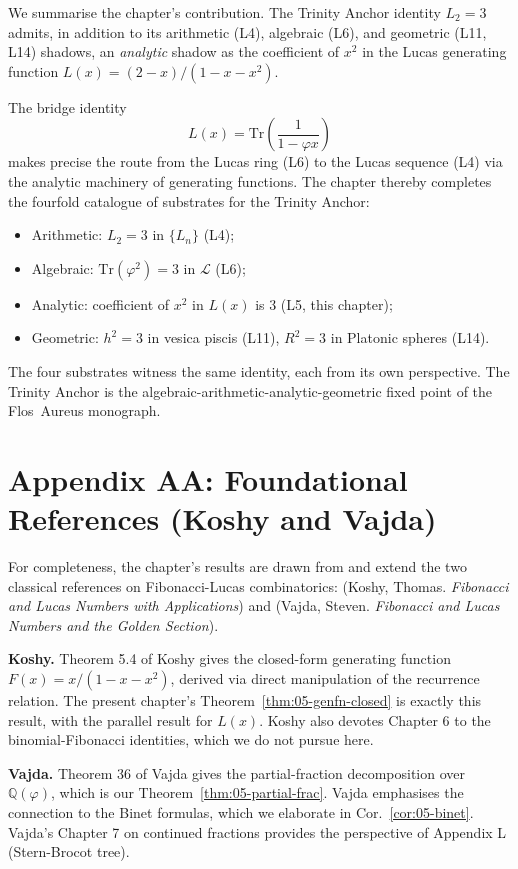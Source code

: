We summarise the chapter's contribution. The Trinity Anchor identity
$L_2 = 3$ admits, in addition to its arithmetic (L4), algebraic (L6),
and geometric (L11, L14) shadows, an \emph{analytic} shadow as the
coefficient of $x^2$ in the Lucas generating function $L(x) = (2-x)/(1-x-x^2)$.

The bridge identity
\[
  L(x) = \mathrm{Tr}\left(\frac{1}{1 - \varphi x}\right)
\]
makes precise the route from the Lucas ring (L6) to the Lucas
sequence (L4) via the analytic machinery of generating functions.
The chapter thereby completes the fourfold catalogue of substrates
for the Trinity Anchor:
\begin{itemize}
  \item Arithmetic: $L_2 = 3$ in $\{L_n\}$ (L4);
  \item Algebraic: $\mathrm{Tr}(\varphi^2) = 3$ in $\mathcal{L}$ (L6);
  \item Analytic: coefficient of $x^2$ in $L(x)$ is $3$ (L5, this chapter);
  \item Geometric: $h^2 = 3$ in vesica piscis (L11), $R^2 = 3$ in Platonic spheres (L14).
\end{itemize}

The four substrates witness the same identity, each from its own
perspective. The Trinity Anchor is the algebraic-arithmetic-analytic-geometric
fixed point of the Flos~Aureus monograph.

\section*{Appendix AA: Foundational References (Koshy and Vajda)}
\label{fa_05:sec:05-app-AA}

For completeness, the chapter's results are drawn from and extend the
two classical references on Fibonacci-Lucas combinatorics:
\cite{koshy_fib_lucas} (Koshy, Thomas. \emph{Fibonacci and Lucas
Numbers with Applications}) and \cite{vajda_fib_lucas} (Vajda,
Steven. \emph{Fibonacci and Lucas Numbers and the Golden Section}).

\textbf{Koshy.} Theorem 5.4 of Koshy gives the closed-form generating
function $F(x) = x/(1-x-x^2)$, derived via direct manipulation of the
recurrence relation. The present chapter's Theorem~\ref{thm:05-genfn-closed}
is exactly this result, with the parallel result for $L(x)$. Koshy
also devotes Chapter 6 to the binomial-Fibonacci identities, which we
do not pursue here.

\textbf{Vajda.} Theorem 36 of Vajda gives the partial-fraction
decomposition over $\mathbb{Q}(\varphi)$, which is our
Theorem~\ref{thm:05-partial-frac}. Vajda emphasises the connection to
the Binet formulas, which we elaborate in Cor.~\ref{cor:05-binet}.
Vajda's Chapter 7 on continued fractions provides the perspective of
Appendix L (Stern-Brocot tree).


